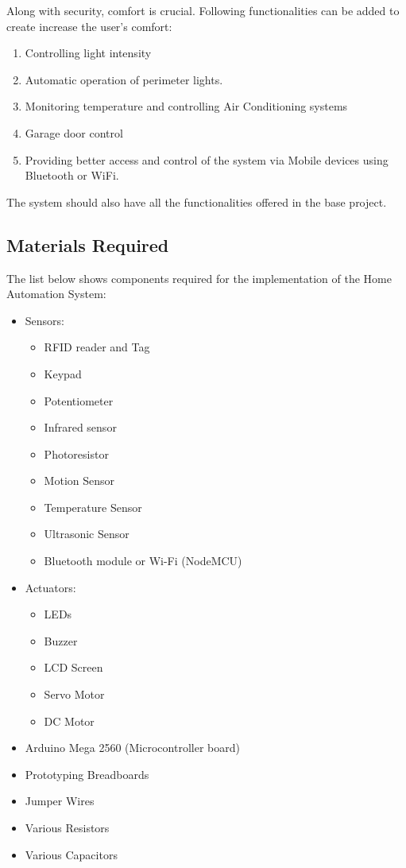 \documentclass[journal]{IEEEtran}
\begin{document}
Along with security, comfort is crucial. Following functionalities can be added to create increase the user’s comfort:
\begin{enumerate}
    \item Controlling light intensity
    \item Automatic operation of perimeter lights.
    \item Monitoring temperature and controlling Air Conditioning systems
    \item Garage door control
    \item Providing better access and control of the system via Mobile devices using Bluetooth or WiFi.
\end{enumerate}
The system should also have all the functionalities offered in the base project.

\subsection{Materials Required}
The list below shows components required for the implementation of the Home Automation System:
\begin{itemize}
	\item{Sensors:}
	\begin{itemize}
		\item{RFID reader and Tag}
		\item{Keypad}
		\item{Potentiometer}
		\item{Infrared sensor}
		\item{Photoresistor}
		\item{Motion Sensor}
		\item{Temperature Sensor}
		\item{Ultrasonic Sensor}
		\item{Bluetooth module or Wi-Fi (NodeMCU)}
	\end{itemize}
	\item{Actuators:}
	\begin{itemize}
		\item{LEDs}
		\item{Buzzer}
		\item{LCD Screen}
		\item{Servo Motor}
		\item{DC Motor}
	\end{itemize}
	\item{Arduino Mega 2560 (Microcontroller board)}
	\item{Prototyping Breadboards}
	\item{Jumper Wires}
	\item{Various Resistors}
	\item{Various Capacitors}
\end{itemize}
\end{document}
